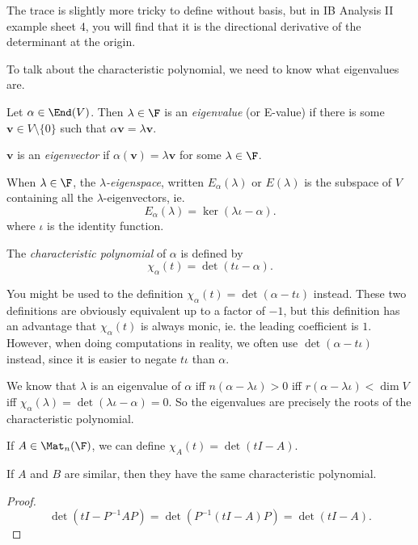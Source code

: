 \documentclass[a4paper]{article}
\begin{document}
The trace is slightly more tricky to define without basis, but in IB Analysis II example sheet 4, you will find that it is the directional derivative of the determinant at the origin.

To talk about the characteristic polynomial, we need to know what eigenvalues are.
\begin{defi}
  Let $\alpha \in \End(V)$. Then $\lambda \in \F$ is an \emph{eigenvalue} (or E-value) if there is some $\mathbf{v} \in V\setminus \{0\}$ such that $\alpha \mathbf{v} = \lambda \mathbf{v}$.

  $\mathbf{v}$ is an \emph{eigenvector} if $\alpha(\mathbf{v}) = \lambda \mathbf{v}$ for some $\lambda \in \F$.

  When $\lambda \in \F$, the \emph{$\lambda$-eigenspace}, written $E_\alpha(\lambda)$ or $E(\lambda)$ is the subspace of $V$ containing all the $\lambda$-eigenvectors, ie.
  \[
    E_\alpha(\lambda) = \ker (\lambda \iota - \alpha).
  \]
  where $\iota$ is the identity function.
\end{defi}
\begin{defi}
  The \emph{characteristic polynomial} of $\alpha$ is defined by
  \[
    \chi_\alpha(t) = \det (t\iota - \alpha).
  \]
\end{defi}
You might be used to the definition $\chi_\alpha(t) = \det(\alpha - t \iota)$ instead. These two definitions are obviously equivalent up to a factor of $-1$, but this definition has an advantage that $\chi_\alpha(t)$ is always monic, ie. the leading coefficient is $1$. However, when doing computations in reality, we often use $\det (\alpha - t\iota)$ instead, since it is easier to negate $t \iota$ than $\alpha$.

We know that $\lambda$ is an eigenvalue of $\alpha$ iff $n(\alpha - \lambda \iota) > 0$ iff $r(\alpha - \lambda \iota) < \dim V$ iff $\chi_\alpha(\lambda) = \det(\lambda \iota - \alpha) = 0$. So the eigenvalues are precisely the roots of the characteristic polynomial.

If $A \in \Mat_n(\F)$, we can define $\chi_A(t) = \det (tI - A)$.
\begin{lemma}
  If $A$ and $B$ are similar, then they have the same characteristic polynomial.
\end{lemma}

\begin{proof}
  \[
    \det (tI - P^{-1}AP) = \det(P^{-1}(tI - A)P) = \det(tI - A).
  \]
\end{proof}
\end{document}
